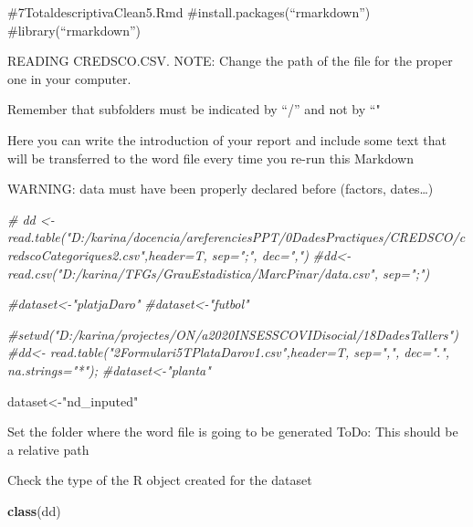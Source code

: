 \documentclass[
]{article}
\author{}
\date{\vspace{-2.5em}}
\newenvironment{Shaded}{\begin{snugshade}}{\end{snugshade}}
\newcommand{\AttributeTok}[1]{\textcolor[rgb]{0.13,0.29,0.53}{#1}}
\newcommand{\CommentTok}[1]{\textcolor[rgb]{0.56,0.35,0.01}{\textit{#1}}}
\newcommand{\FunctionTok}[1]{\textcolor[rgb]{0.13,0.29,0.53}{\textbf{#1}}}
\newcommand{\NormalTok}[1]{#1}
\newcommand{\OtherTok}[1]{\textcolor[rgb]{0.56,0.35,0.01}{#1}}
\newcommand{\StringTok}[1]{\textcolor[rgb]{0.31,0.60,0.02}{#1}}
\begin{document}
\#7TotaldescriptivaClean5.Rmd \#install.packages(``rmarkdown'')
\#library(``rmarkdown'')

READING CREDSCO.CSV. NOTE: Change the path of the file for the proper
one in your computer.

Remember that subfolders must be indicated by ``/'' and not by ``"

Here you can write the introduction of your report and include some text
that will be transferred to the word file every time you re-run this
Markdown

WARNING: data must have been properly declared before (factors,
dates\ldots)

\begin{Shaded}
\begin{Highlighting}[]
\CommentTok{\# dd \textless{}{-} read.table("D:/karina/docencia/areferenciesPPT/0DadesPractiques/CREDSCO/credscoCategoriques2.csv",header=T, sep=";", dec=",")}
\CommentTok{\#dd\textless{}{-} read.csv("D:/karina/TFGs/GrauEstadistica/MarcPinar/data.csv", sep=";")}

\CommentTok{\#dataset\textless{}{-}"platjaDaro"}
\CommentTok{\#dataset\textless{}{-}"futbol"}

\CommentTok{\#setwd("D:/karina/projectes/ON/a2020INSESSCOVIDisocial/18DadesTallers")}
\CommentTok{\#dd\textless{}{-} read.table("2Formulari5TPlataDarov1.csv",header=T, sep=",", dec=".", na.strings="*");}
\CommentTok{\#dataset\textless{}{-}"planta"}


\NormalTok{dataset}\OtherTok{\textless{}{-}}\StringTok{"nd\_inputed"}
\end{Highlighting}
\end{Shaded}

Set the folder where the word file is going to be generated ToDo: This
should be a relative path

\begin{Shaded}
\end{Shaded}

Check the type of the R object created for the dataset

\begin{Shaded}
\begin{Highlighting}[]
\FunctionTok{class}\NormalTok{(dd)}
\end{Highlighting}
\end{Shaded}
\end{document}
